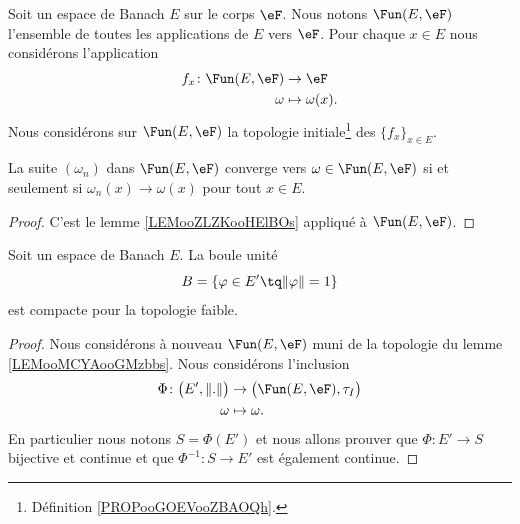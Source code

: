 \begin{lemma}       \label{LEMooMCYAooGMzbbs}
	Soit un espace de Banach \( E\) sur le corps \( \eF\). Nous notons \( \Fun(E,\eF)\) l'ensemble de toutes les applications de \( E\) vers \( \eF\). Pour chaque \( x\in E\) nous considérons l'application
	\begin{equation}
		\begin{aligned}
			f_x\colon \Fun(E,\eF) & \to \eF            \\
			\omega                & \mapsto \omega(x).
		\end{aligned}
	\end{equation}
	Nous considérons sur \( \Fun(E,\eF)\) la topologie initiale\footnote{Définition \ref{PROPooGOEVooZBAOQh}.} des \( \{ f_x \}_{x\in E}\).

	La suite \( (\omega_n)\) dans \( \Fun(E,\eF)\) converge vers  \(\omega\in \Fun(E,\eF)\) si et seulement si \( \omega_n(x)\to\omega(x)\) pour tout \( x\in E\).
\end{lemma}

\begin{proof}
	C'est le lemme \ref{LEMooZLZKooHElBOs} appliqué à \( \Fun(E,\eF)\).
\end{proof}


\begin{theorem}       \label{THOooRECTooEVLHSq}
	Soit un espace de Banach \( E\). La boule unité
	\begin{equation}
		B=\{ \varphi\in E'\tq \| \varphi \|=1 \}
	\end{equation}
	est compacte pour la topologie faible.
\end{theorem}

\begin{proof}
	Nous considérons à nouveau \( \Fun(E, \eF)\) muni de la topologie du lemme \ref{LEMooMCYAooGMzbbs}. Nous considérons l'inclusion
	\begin{equation}
		\begin{aligned}
			\Phi\colon \big( E',\| . \| \big) & \to \big( \Fun(E,\eF), \tau_I \big) \\
			\omega                            & \mapsto \omega.
		\end{aligned}
	\end{equation}
	En particulier nous notons \( S=\Phi(E')\) et nous allons prouver que \( \Phi\colon E'\to S\) bijective et continue et que \( \Phi^{-1}\colon S\to E'\) est également continue.
\end{proof}


